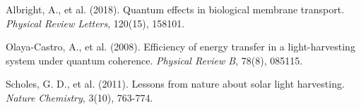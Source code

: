 \documentclass[12pt,a4paper]{article}
\begin{document}
\begin{thebibliography}{99}
Albright, A., et al. (2018). Quantum effects in biological membrane transport. \textit{Physical Review Letters}, 120(15), 158101.

Olaya-Castro, A., et al. (2008). Efficiency of energy transfer in a light-harvesting system under quantum coherence. \textit{Physical Review B}, 78(8), 085115.

Scholes, G. D., et al. (2011). Lessons from nature about solar light harvesting. \textit{Nature Chemistry}, 3(10), 763-774.

\end{thebibliography}
\end{document}
